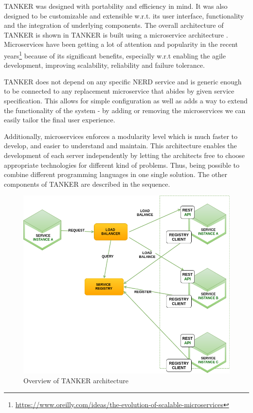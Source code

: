 \documentclass{sig-alternate}
\makeatletter
\def\maxwidth#1{\ifdim\Gin@nat@width>#1 #1\else\Gin@nat@width\fi}
\makeatother
\begin{document}
TANKER was designed with portability and efficiency in mind. It was also designed to be customizable and extensible w.r.t. its user interface, functionality and the integration of underlying components. The overall architecture of TANKER is shown in TANKER is built using a microservice architecture  \cite{_Ref490760546}. Microservices have been getting a lot of attention and popularity in the recent years\footnote{\url{https://www.oreilly.com/ideas/the-evolution-of-scalable-microservices}} because of its significant benefits, especially w.r.t enabling the agile development, improving scalability, reliability and failure tolerance.

TANKER does not depend on any specific NERD service and is generic enough to be connected to any replacement microservice that abides by given service specification. This allows for simple configuration as well as adds a way to extend the functionality of the system - by adding or removing the microservices we can easily tailor the final user experience.

Additionally, microservices enforces a modularity level which is much faster to develop, and easier to understand and maintain. This architecture enables the development of each server independently by letting the architects free to choose appropriate technologies for different kind of problems. Thus, being possible to combine different programming languages in one single solution. The other components of TANKER are described in the sequence.
\begin{figure}[h!]
\centering
\includegraphics[width=\maxwidth{\columnwidth}]{./img/image1.png}
\cprotect\caption{Overview of TANKER architecture}
\label{_Ref490756012}
\end{figure}
\end{document}
